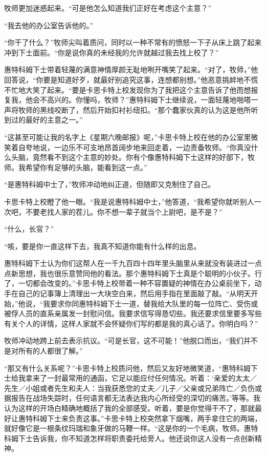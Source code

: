     牧师更加迷惑起来。“可是他怎么知道我们正好在考虑这个主意？”

    “我去他的办公室告诉他的。”

    “你干了什么？”牧师尖叫着质问，同时以一种不常有的愤怒一下子从床上跳了起来冲到下士面前。“你是说你真的未经我的允许就越过我去找上校了？”

    惠特科姆下士带着轻蔑的满意神情厚颜无耻地咧开嘴笑了起来。“对了，牧师，”他回答说，“你要是知道好歹，就最好别追究这事，连想都别想。”他恶意挑衅地不慌不忙地大笑了起来。“要是卡思卡特上校发现你为了我把这个主意告诉了他而想报复我，他会不高兴的。你懂吗，牧师？”惠特科姆下士继续说，一面轻蔑地啪嗒一声将牧师的黑线咬断了，然后开始扣衬衫纽扣。“那个蠢家伙真的认为这是他所听到过的最好的主意之一。”

    “这甚至可能让我的名字上《星期六晚邮报》呢，”卡思卡特上校在他的办公室里微笑着自夸地说，一边乐不可支地昂首阔步地来回走着，一边责备牧师。“你真没什么头脑，竟然看不到这个主意的妙处。你有个像惠特科姆下士这样的好部下，牧师。我希望你有足够的头脑，能看到这一点。”

    “是惠特科姆中士了，”牧师冲动地纠正道，但随即又克制住了自己。

    卡思卡特上校瞪了他一眼。“我是说惠特科姆中士，”他答道，“我希望你就听别人一次吧，不要老找人家的茬儿。你不想一辈子就当个上尉吧，是不是？”

    “什么，长官？”

    “咳，要是你一直这样下去，我真不知道你能有什么样的出息。

    惠特科姆下士认为你们这帮人在一千九百四十四年里头脑里从来就没有装进过一点点新思想，我也很乐意赞同他的看法。那个惠特科姆下士真是个聪明的小伙子。行了，一切都会改变的。”卡思卡特上校带着一种不容置疑的神情在办公桌前坐下，动手在自己的记事簿上清理出一大块空白来，然后用手指在里面敲了敲。“从明天开始，”他说，“我要求你同惠特科姆下士一道，替我给大队里的每一位阵亡、受伤或被俘人员的直系亲属发一封慰问信。我要求信写得恳切些。我还要求信里要多写些有关个人的详情，这样人家就不会怀疑你们写的都是我的真心话了。你明白吗？”

    牧师冲动地跨上前去表示抗议。“可是长官，这不可能！”他脱口而出，“我们并不是对所有的人都很了解。”

    “那又有什么关系呢？”卡思卡特上校质问他，然后又友好地微笑道，“惠特科姆下士给我拿来了一封最常用的通函，它足以能应付任何情况。听着：‘亲爱的太太／先生／小姐或者先生和夫人：当我获悉您的丈夫／儿子／父亲或兄弟阵亡／负伤或据报告在战场失踪时，任何语言都无法表达我内心所经受的深切的痛苦。’等等。我认为这样的开场白精确地概括了我的全部感受。听着，要是你觉得干不了，那就最好让惠特科姆下士来负责这事。”卡思卡特上校突然拿下烟嘴，两手拿住它的两端，就好像它是一根条纹玛瑞和象牙做的马鞭一样。“这是你的一个毛病，牧师。惠特科姆下士告诉我，你不知道怎样将职责委托给旁人。他还说你这人没有一点创新精神。

